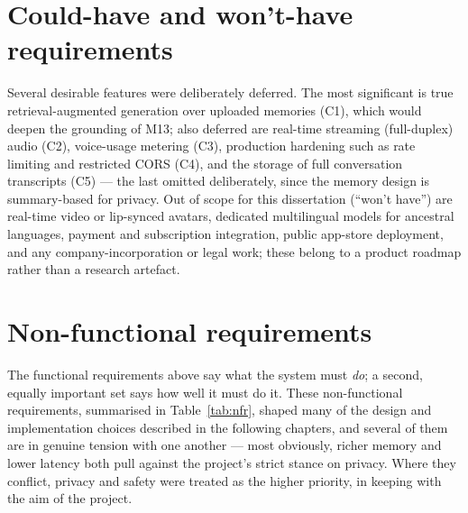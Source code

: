 \documentclass[11pt,a4paper]{report}
\begin{document}
\section{Could-have and won't-have requirements}
Several desirable features were deliberately deferred. The most significant is true retrieval-augmented generation over uploaded memories (C1), which would deepen the grounding of M13; also deferred are real-time streaming (full-duplex) audio (C2), voice-usage metering (C3), production hardening such as rate limiting and restricted CORS (C4), and the storage of full conversation transcripts (C5) --- the last omitted deliberately, since the memory design is summary-based for privacy. Out of scope for this dissertation (``won't have'') are real-time video or lip-synced avatars, dedicated multilingual models for ancestral languages, payment and subscription integration, public app-store deployment, and any company-incorporation or legal work; these belong to a product roadmap rather than a research artefact.

\section{Non-functional requirements}
\label{sec:nfr}
The functional requirements above say what the system must \emph{do}; a second, equally important set says how well it must do it. These non-functional requirements, summarised in Table~\ref{tab:nfr}, shaped many of the design and implementation choices described in the following chapters, and several of them are in genuine tension with one another --- most obviously, richer memory and lower latency both pull against the project's strict stance on privacy. Where they conflict, privacy and safety were treated as the higher priority, in keeping with the aim of the project.
\end{document}
